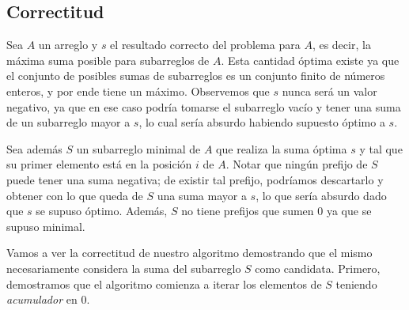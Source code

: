 
\subsection{Correctitud}

Sea $A$ un arreglo y $s$ el resultado correcto del problema para $A$, es decir, la máxima suma posible para subarreglos de $A$. Esta cantidad óptima existe ya que el conjunto de posibles sumas de subarreglos es un conjunto finito de números enteros, y por ende tiene un máximo. Observemos que $s$ nunca será un valor negativo, ya que en ese caso podría tomarse el subarreglo vacío y tener una suma de un subarreglo mayor a $s$, lo cual sería absurdo habiendo supuesto óptimo a $s$.

Sea además $S$ un subarreglo minimal de $A$ que realiza la suma óptima $s$ y tal que su primer elemento está en la posición $i$ de $A$. Notar que ningún prefijo de $S$ puede tener una suma negativa; de existir tal prefijo, podríamos descartarlo y obtener con lo que queda de $S$ una suma mayor a $s$, lo que sería absurdo dado que $s$ se supuso óptimo. Además, $S$ no tiene prefijos que sumen $0$ ya que se supuso minimal.

Vamos a ver la correctitud de nuestro algoritmo demostrando que el mismo necesariamente considera la suma del subarreglo $S$ como candidata. Primero, demostramos que el algoritmo comienza a iterar los elementos de $S$ teniendo \textit{acumulador} en $0$.

